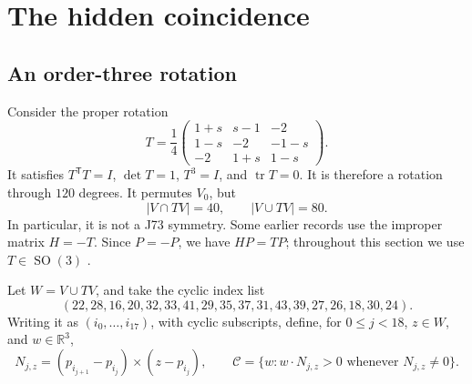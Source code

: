 \documentclass[11pt]{amsart}
\newcommand{\R}{\mathbb R}
\newcommand{\SO}{\operatorname{SO}}
\newcommand{\tr}{\operatorname{tr}}
\theoremstyle{definition}
\theoremstyle{remark}
\begin{document}
\section{The hidden coincidence}\label{sec:hidden}

\subsection{An order-three rotation}
Consider the proper rotation
\begin{equation}\label{eq:T}
 T=\frac14\begin{pmatrix}
 1+s&s-1&-2\\
 1-s&-2&-1-s\\
 -2&1+s&1-s
 \end{pmatrix}.
\end{equation}
It satisfies $T^{\mathsf T}T=I$, $\det T=1$, $T^3=I$, and $\tr T=0$.
It is therefore a rotation through $120$ degrees. It permutes $V_0$, but
\begin{equation}\label{eq:shared}
 |V\cap TV|=40,\qquad |V\cup TV|=80.
\end{equation}
In particular, it is not a J73 symmetry. Some earlier records use the
improper matrix $H=-T$. Since $P=-P$, we have $HP=TP$; throughout this
section we use $T\in\SO(3)$ \cite{hidden}.

Let $W=V\cup TV$, and take the cyclic index list
\begin{equation}\label{eq:cycle}
 (22,28,16,20,32,33,41,29,35,37,31,43,39,27,26,18,30,24).
\end{equation}
Writing it as $(i_0,\ldots,i_{17})$, with cyclic subscripts, define,
for $0\le j<18$, $z\in W$, and $w\in\R^3$,
\[
 N_{j,z}=(p_{i_{j+1}}-p_{i_j})\times(z-p_{i_j}),\qquad
 \mathcal C=\{w:w\cdot N_{j,z}>0\text{ whenever }N_{j,z}\ne0\}.
\]
\end{document}
